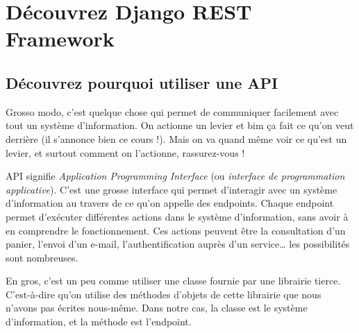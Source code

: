 %
%
%
%
%
% 
%
% 
 \section{Découvrez Django REST Framework}
 \subsection{Découvrez pourquoi utiliser une API}
 Grosso modo, c’est quelque chose qui permet de communiquer facilement avec tout un système d’information. On actionne un levier et bim ça fait ce qu’on veut derrière (il s’annonce bien ce cours !). Mais on va quand même voir ce qu’est un levier, et surtout comment on l’actionne, rassurez-vous !

{\color{monOrange}API} signifie {\em Application Programming Interface} (ou {\em interface de programmation applicative}). C’est une grosse interface qui permet d'interagir avec un système d’information au travers de ce qu’on appelle des endpoints. Chaque endpoint permet d’exécuter différentes actions dans le système d’information, sans avoir à en comprendre le fonctionnement. Ces actions peuvent être la consultation d’un panier, l’envoi d’un e-mail, l’authentification auprès d’un service… les possibilités sont nombreuses.
\begin{theorem}
En gros, c’est un peu comme utiliser une classe fournie par une librairie tierce. C’est-à-dire qu’on utilise des méthodes d'objets de cette librairie que nous n’avons pas écrites nous-même. Dans notre cas, la classe est le système d’information, et la méthode est l'endpoint.
\end{theorem}
